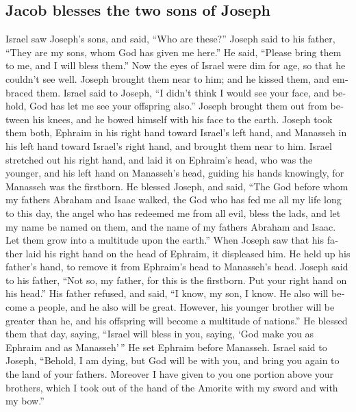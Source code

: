 \begin{paracol}{2}
\begin{otherlanguage}{english}
\hypertarget{jacob-blesses-the-two-sons-of-joseph}{%
\subsection{Jacob blesses the two sons of
Joseph}\label{jacob-blesses-the-two-sons-of-joseph}}

 Israel saw Joseph's sons, and said, ``Who are these?''
 Joseph said to his father, ``They are my sons, whom God
has given me here.'' He said, ``Please bring them to me, and I will
bless them.''  Now the eyes of Israel were dim for age,
so that he couldn't see well. Joseph brought them near to him; and he
kissed them, and embraced them.  Israel said to Joseph,
``I didn't think I would see your face, and behold, God has let me see
your offspring also.''  Joseph brought them out from
between his knees, and he bowed himself with his face to the earth.
 Joseph took them both, Ephraim in his right hand toward
Israel's left hand, and Manasseh in his left hand toward Israel's right
hand, and brought them near to him.  Israel stretched out
his right hand, and laid it on Ephraim's head, who was the younger, and
his left hand on Manasseh's head, guiding his hands knowingly, for
Manasseh was the firstborn.  He blessed Joseph, and said,
``The God before whom my fathers Abraham and Isaac walked, the God who
has fed me all my life long to this day,  the angel who
has redeemed me from all evil, bless the lads, and let my name be named
on them, and the name of my fathers Abraham and Isaac. Let them grow
into a multitude upon the earth.''  When Joseph saw that
his father laid his right hand on the head of Ephraim, it displeased
him. He held up his father's hand, to remove it from Ephraim's head to
Manasseh's head.  Joseph said to his father, ``Not so, my
father, for this is the firstborn. Put your right hand on his head.''
 His father refused, and said, ``I know, my son, I know.
He also will become a people, and he also will be great. However, his
younger brother will be greater than he, and his offspring will become a
multitude of nations.''  He blessed them that day,
saying, ``Israel will bless in you, saying, `God make you as Ephraim and
as Manasseh'\,'' He set Ephraim before Manasseh.  Israel
said to Joseph, ``Behold, I am dying, but God will be with you, and
bring you again to the land of your fathers.  Moreover I
have given to you one portion above your brothers, which I took out of
the hand of the Amorite with my sword and with my bow.''


\end{otherlanguage}
\end{paracol}
